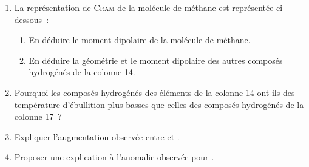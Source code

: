 \documentclass[a4paper, 12pt, final, garamond]{book}
\begin{document}
\begin{enumerate}
    \item La représentation de \textsc{Cram} de la molécule de méthane est
        représentée ci-dessous~:
        \begin{center}
        \end{center}
        \begin{enumerate}
            \item En déduire le moment dipolaire de la molécule de méthane.
            \item En déduire la géométrie et le moment dipolaire des autres
                composés hydrogénés de la colonne 14.
        \end{enumerate}
    \item Pourquoi les composés hydrogénés des éléments de la colonne 14 ont-ils
        des température d'ébullition plus basses que celles des composés
        hydrogénés de la colonne 17~?
    \item Expliquer l'augmentation observée entre  et .
    \item Proposer une explication à l'anomalie observée pour .
\end{enumerate}
\end{document}
